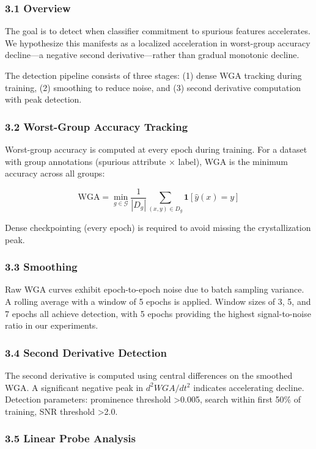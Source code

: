 
\subsubsection{3.1 Overview}

The goal is to detect when classifier commitment to spurious features accelerates. We hypothesize this manifests as a localized acceleration in worst-group accuracy decline---a negative second derivative---rather than gradual monotonic decline.

The detection pipeline consists of three stages: (1) dense WGA tracking during training, (2) smoothing to reduce noise, and (3) second derivative computation with peak detection.

\subsubsection{3.2 Worst-Group Accuracy Tracking}

Worst-group accuracy is computed at every epoch during training. For a dataset with group annotations (spurious attribute $\times$ label), WGA is the minimum accuracy across all groups:

$$\text{WGA} = \min_{g \in \mathcal{G}} \frac{1}{|D_g|} \sum_{(x,y) \in D_g} \mathbf{1}[\hat{y}(x) = y]$$

Dense checkpointing (every epoch) is required to avoid missing the crystallization peak.

\subsubsection{3.3 Smoothing}

Raw WGA curves exhibit epoch-to-epoch noise due to batch sampling variance. A rolling average with a window of 5 epochs is applied. Window sizes of 3, 5, and 7 epochs all achieve detection, with 5 epochs providing the highest signal-to-noise ratio in our experiments.

\subsubsection{3.4 Second Derivative Detection}

The second derivative is computed using central differences on the smoothed WGA. A significant negative peak in $d^2WGA/dt^2$ indicates accelerating decline. Detection parameters: prominence threshold >0.005, search within first 50\% of training, SNR threshold >2.0.

\subsubsection{3.5 Linear Probe Analysis}


